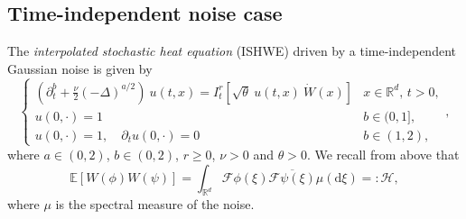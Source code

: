 \documentclass[12pt]{report}
\theoremstyle{plain}
\theoremstyle{definition}
\numberwithin{equation}{section}
\newcommand{\R}{\mathbb{R}}
\newcommand{\ud}{\ensuremath{ \mathrm{d} }}
\begin{document}
\subsection{Time-independent noise case} \label{SS:ISHWEtimeind}

The {\em interpolated stochastic heat equation} (ISHWE) driven by a time-independent Gaussian noise is given by 
	\begin{equation} \label{E:ISHWE}
	\begin{cases}
	\left(\partial^b_t + \frac{\nu}{2}(-\Delta)^{a/2}\right)\: u(t,x) = I^r_t \left[\sqrt{\theta}\: u(t,x)\: \dot W(x) \right] & \text{$x\in \R^d$, $t>0$}, \\
	u(0,\cdot) = 1                                                                                                             & b \in (0,1],               \\
	u(0,\cdot) = 1, \quad \partial_t u(0,\cdot) = 0                                                                            & b \in (1,2),
	\end{cases},
	\end{equation}
where $a \in (0,2)$, $b \in (0,2)$, $r\ge0$, $\nu >0$ and $\theta > 0$. We recall from above that 
	\[
		\mathbb{E}[W(\phi)W(\psi)] = \int_{\R^d} \mathcal{F}\phi(\xi) \overline{\mathcal{F}\psi(\xi)} \mu(\ud \xi) =: \mathcal{H},
	\]
where $\mu$ is the spectral measure of the noise.
\end{document}
